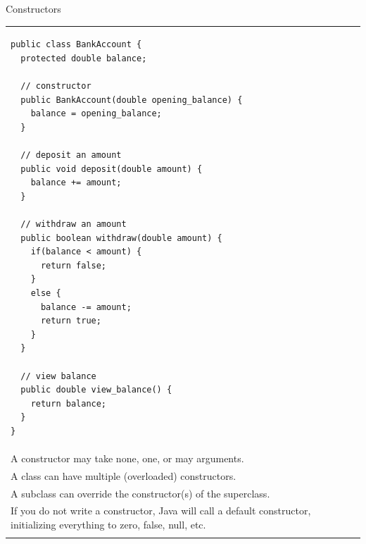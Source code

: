 \documentclass{beamer}
\makeatletter
\newenvironment{splitslide}
{
\centering
\begin{tabular}{@{}p{0.50\textwidth} | p{0.025\textwidth}@{} p{0.4\textwidth}@{}}
}
{
\end{tabular}
}
\makeatother
\begin{document}
\begin{frame}[fragile]{Constructors}
\begin{splitslide}

\centering
\begin{Verbatim}[fontsize=\tiny]
public class BankAccount {
  protected double balance;
  
  // constructor
  public BankAccount(double opening_balance) {
    balance = opening_balance;
  }  

  // deposit an amount
  public void deposit(double amount) {
    balance += amount;
  }
  
  // withdraw an amount
  public boolean withdraw(double amount) {
    if(balance < amount) {
      return false;
    }
    else {
      balance -= amount;
      return true;
    }
  }
  
  // view balance
  public double view_balance() {
    return balance;  
  }
}
\end{Verbatim}

&&

\raggedright
\begin{footnotesize}
In Java, a constructor is a method inside a class that has, simply, the name of the class (and no return type). \\
\vspace{0.5em}
A constructor may take none, one, or may arguments. \\
\vspace{0.5em}
A class can have multiple (overloaded) constructors. \\
\vspace{0.5em}
A subclass can override the constructor(s) of the superclass. \\
\vspace{0.5em}
If you do not write a constructor, Java will call a default constructor, initializing everything to zero, false, null, etc. \\
\end{footnotesize}

\end{splitslide}
\end{frame}
\end{document}
